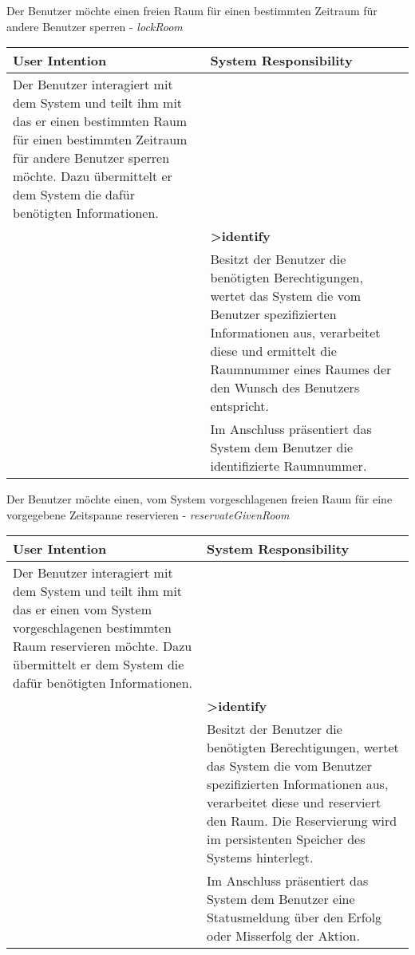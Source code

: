 \begin{table}[h]
	Der Benutzer möchte einen freien Raum für einen bestimmten Zeitraum für andere Benutzer sperren - \textit{lockRoom}\\
	\begin{tabularx}{\textwidth}{|X|X|}
	\rowcolor{heading} \textbf{User Intention} & \textbf{System Responsibility}\\ \hline
	Der Benutzer interagiert mit dem System und teilt ihm mit das er einen bestimmten Raum für einen bestimmten Zeitraum für andere Benutzer sperren möchte. Dazu übermittelt er dem System die dafür benötigten Informationen. & \\  \hline
	 & \textbf{>identify} \\ \hline
	 & Besitzt der Benutzer die benötigten Berechtigungen, wertet das System die vom Benutzer spezifizierten Informationen aus, verarbeitet diese und ermittelt die Raumnummer eines Raumes der den Wunsch des Benutzers entspricht.\\ \hline
	 & Im Anschluss präsentiert das System dem Benutzer die identifizierte Raumnummer. \\ \hline
	\end{tabularx}
	
	Der Benutzer möchte einen, vom System vorgeschlagenen freien Raum für eine vorgegebene Zeitspanne reservieren - \textit{reservateGivenRoom}\\
	\begin{tabularx}{\textwidth}{|X|X|}
	\rowcolor{heading} \textbf{User Intention} & \textbf{System Responsibility}\\ \hline
	Der Benutzer interagiert mit dem System und teilt ihm mit das er einen vom System vorgeschlagenen bestimmten Raum reservieren möchte. Dazu übermittelt er dem System die dafür benötigten Informationen. & \\  \hline
	 & \textbf{>identify} \\ \hline
	 & Besitzt der Benutzer die benötigten Berechtigungen, wertet das System die vom Benutzer spezifizierten Informationen aus, verarbeitet diese und reserviert den Raum. Die Reservierung wird im persistenten Speicher des Systems hinterlegt.\\ \hline
	 & Im Anschluss präsentiert das System dem Benutzer eine Statusmeldung über den Erfolg oder Misserfolg der Aktion. \\ \hline
	\end{tabularx}
\end{table}


